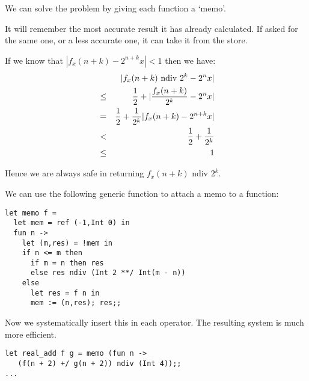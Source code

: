 \begin{slide*}


\vspace*{0.5cm}

We can solve the problem by giving each function a `memo'.

It will remember the most accurate result it has already calculated. If asked
for the same one, or a less accurate one, it can take it from the store.

If we know that {\red $|f_x(n + k) - 2^{n + k} x| < 1$} then we have:
{\red \begin{eqnarray*}
&      & |f_x(n + k) \mbox{ ndiv } 2^ k - 2^n x|                        \\
& \leq & {1 \over 2} + |{f_x(n + k) \over 2^k} - 2^n x|                 \\
& =    & {1 \over 2} + {1 \over 2^k} |f_x(n + k) - 2^{n + k} x|         \\
& <    & {1 \over 2} + {1 \over 2^k}                                    \\
& \leq & 1
\end{eqnarray*}}

Hence we are always safe in returning {\red $f_x(n + k) \mbox{ ndiv } 2^k$}.

\end{slide*}



\begin{slide*}


\vspace*{0.5cm}

We can use the following generic function to attach a memo to a function:
\begin{black}\begin{verbatim}
let memo f =
  let mem = ref (-1,Int 0) in
  fun n ->
    let (m,res) = !mem in
    if n <= m then
      if m = n then res
      else res ndiv (Int 2 **/ Int(m - n))
    else
      let res = f n in
      mem := (n,res); res;;
\end{verbatim}\end{black}
Now we systematically insert this in each operator. The resulting system is
much more efficient.
\begin{black}\begin{verbatim}
let real_add f g = memo (fun n ->
   (f(n + 2) +/ g(n + 2)) ndiv (Int 4));;
...
\end{verbatim}\end{black}

\end{slide*}





